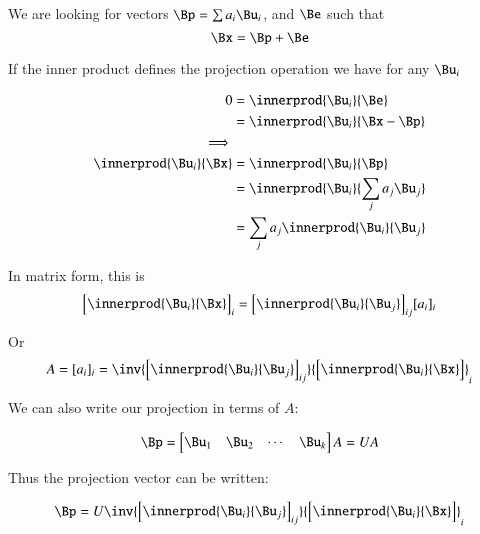 We are looking for vectors $\Bp = \sum a_i \Bu_i$, and $\Be$ such that
\[
\Bx = \Bp + \Be
\]

If the inner product defines the projection operation we have for any $\Bu_i$

\begin{align*}
0 &= \innerprod{\Bu_i}{\Be} \\
  &= \innerprod{\Bu_i}{\Bx - \Bp} \\
\implies \\
\innerprod{\Bu_i}{\Bx} &= \innerprod{\Bu_i}{\Bp} \\
                       &= \innerprod{\Bu_i}{\sum_j a_j \Bu_j} \\
                       &= \sum_j a_j \innerprod{\Bu_i}{\Bu_j} \\
\end{align*}

In matrix form, this is
\begin{equation*}
{
\begin{bmatrix}
\innerprod{\Bu_i}{\Bx}
\end{bmatrix}
}_i
=
{
\begin{bmatrix}
\innerprod{\Bu_i}{\Bu_j}
\end{bmatrix}
}_{ij}
[a_i]_i
\end{equation*}

Or
\begin{equation*}
A = [a_i]_i = 
\inv{
   {
   \begin{bmatrix}
   \innerprod{\Bu_i}{\Bu_j}
   \end{bmatrix}
   }_{ij}
}
{
\begin{bmatrix}
\innerprod{\Bu_i}{\Bx}
\end{bmatrix}
}_i
\end{equation*}

We can also write our projection in terms of $A$:

\begin{equation*}
\Bp = 
\begin{bmatrix}
\Bu_1 & \Bu_2 & \cdots & \Bu_k
\end{bmatrix}
A
= U A
\end{equation*}

Thus the projection vector can be written:

\begin{equation*}
\Bp = U 
\inv{
   {
   \begin{bmatrix}
   \innerprod{\Bu_i}{\Bu_j}
   \end{bmatrix}
   }_{ij}
}
{
\begin{bmatrix}
\innerprod{\Bu_i}{\Bx}
\end{bmatrix}
}_i
\end{equation*}

